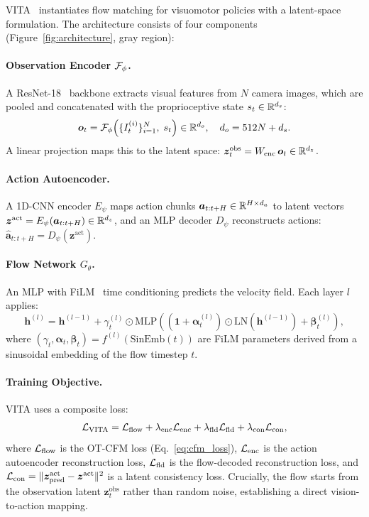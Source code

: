 VITA~\cite{gao2026vita} instantiates flow matching for visuomotor policies with a latent-space formulation. The architecture consists of four components (Figure~\ref{fig:architecture}, gray region):

\paragraph{Observation Encoder $\mathcal{F}_\phi$.} A ResNet-18~\cite{he2016deep} backbone extracts visual features from $N$ camera images, which are pooled and concatenated with the proprioceptive state $s_t \in \mathbb{R}^{d_s}$:
\begin{equation}
    \bm{o}_t = \mathcal{F}_\phi\!\left(\{I_t^{(i)}\}_{i=1}^N,\; s_t\right) \in \mathbb{R}^{d_o}, \quad d_o = 512N + d_s.
    \label{eq:obs_encoder}
\end{equation}
A linear projection maps this to the latent space: $\bm{z}_t^{\text{obs}} = W_{\text{enc}}\, \bm{o}_t \in \mathbb{R}^{d_z}$.

\paragraph{Action Autoencoder.} A 1D-CNN encoder $E_\psi$ maps action chunks $\bm{a}_{t:t+H} \in \mathbb{R}^{H \times d_a}$ to latent vectors $\bm{z}^{\text{act}} = E_\psi(\bm{a}_{t:t+H}) \in \mathbb{R}^{d_z}$, and an MLP decoder $D_\psi$ reconstructs actions: $\hat{\bm{a}}_{t:t+H} = D_\psi(\bm{z}^{\text{act}})$.

\paragraph{Flow Network $G_\theta$.} An MLP with FiLM~\cite{perez2018film} time conditioning predicts the velocity field. Each layer $l$ applies:
\begin{equation}
    \bm{h}^{(l)} = \bm{h}^{(l-1)} + \gamma_t^{(l)} \odot \text{MLP}\!\left((\bm{1} + \bm{\alpha}_t^{(l)}) \odot \text{LN}(\bm{h}^{(l-1)}) + \bm{\beta}_t^{(l)}\right),
    \label{eq:film_layer}
\end{equation}
where $(\gamma_t, \bm{\alpha}_t, \bm{\beta}_t) = f^{(l)}(\text{SinEmb}(t))$ are FiLM parameters derived from a sinusoidal embedding of the flow timestep $t$.

\paragraph{Training Objective.} VITA uses a composite loss:
\begin{equation}
    \mathcal{L}_{\text{VITA}} = \mathcal{L}_{\text{flow}} + \lambda_{\text{enc}} \mathcal{L}_{\text{enc}} + \lambda_{\text{fld}} \mathcal{L}_{\text{fld}} + \lambda_{\text{con}} \mathcal{L}_{\text{con}},
    \label{eq:vita_loss}
\end{equation}
where $\mathcal{L}_{\text{flow}}$ is the OT-CFM loss (Eq.~\ref{eq:cfm_loss}), $\mathcal{L}_{\text{enc}}$ is the action autoencoder reconstruction loss, $\mathcal{L}_{\text{fld}}$ is the flow-decoded reconstruction loss, and $\mathcal{L}_{\text{con}} = \|\bm{z}^{\text{act}}_{\text{pred}} - \bm{z}^{\text{act}}\|^2$ is a latent consistency loss. Crucially, the flow starts from the observation latent $\bm{z}_t^{\text{obs}}$ rather than random noise, establishing a direct vision-to-action mapping.

